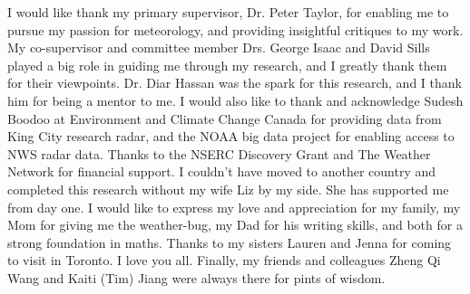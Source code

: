 I would like thank my primary supervisor, Dr. Peter Taylor, for enabling me to pursue my passion for meteorology, and providing insightful critiques to my
work. My co-supervisor and committee member Drs. George Isaac and David Sills played a big role in guiding me through my research, and I greatly thank them for 
their viewpoints. Dr. Diar Hassan was the spark for this research, and I thank him for being a mentor to me. I would also like to thank and acknowledge Sudesh
Boodoo at Environment and Climate Change Canada for providing data from King City research radar, and the NOAA big data project for enabling access to NWS
radar data. Thanks to the NSERC Discovery Grant and The Weather Network for financial support. I couldn't have moved to another country and completed this
research without my wife Liz by my side. She has supported me from day one. I would like to express my love and appreciation for my family, my Mom for giving
me the weather-bug, my Dad for his writing skills, and both for a strong foundation in maths. Thanks to my sisters Lauren and Jenna for coming to visit in
Toronto. I love you all. Finally, my friends and colleagues Zheng Qi Wang and Kaiti (Tim) Jiang were always there for pints of wisdom.